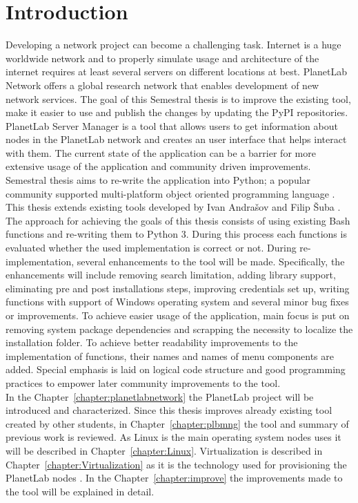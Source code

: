 \chapter*{Introduction}
{}

Developing a network project can become a challenging task. Internet is a huge worldwide network and to properly simulate usage and architecture of the internet requires at least several servers on different locations at best. PlanetLab Network offers a global research network that enables development of new network services. The goal of this Semestral thesis is to improve the existing tool, make it easier to use and publish the changes by updating the PyPI repositories. PlanetLab Server Manager is a tool that allows users to get information about nodes in the PlanetLab network and creates an user interface that helps interact with them. The current state of the application can be a barrier for more extensive usage of the application and community driven improvements. Semestral thesis aims to re-write the application into Python; a popular community supported multi-platform object oriented programming language \cite{lutz2013learning}. This thesis extends existing tools developed by Ivan Andrašov \cite{andrasov2} and Filip Šuba \cite{suba1}.\\
The approach for achieving the goals of this thesis consists of using existing Bash functions and re-writing them to Python 3. During this process each functions is evaluated whether the used implementation is correct or not. During re-implementation, several enhancements to the tool will be made. Specifically, the enhancements will include removing search limitation, adding library support, eliminating pre and post installations steps, improving credentials set up, writing functions with support of Windows operating system and several minor bug fixes or improvements. To achieve easier usage of the application, main focus is put on removing system package dependencies and scrapping the necessity to localize the installation folder. To achieve better readability improvements to the implementation of functions, their names and names of menu components are added. Special emphasis is laid on logical code structure and good programming practices to empower later community improvements to the tool.\\
In the Chapter~\ref{chapter:planetlabnetwork} the PlanetLab project will be introduced and characterized. Since this thesis improves already existing tool created by other students, in Chapter~\ref{chapter:plbmng} the tool and summary of previous work is reviewed. As Linux is the main operating system nodes uses it will be described in Chapter~\ref{chapter:Linux}. Virtualization is described in Chapter~\ref{chapter:Virtualization} as it is the technology used for provisioning the PlanetLab nodes \cite{planetlababout}. In the Chapter~\ref{chapter:improve} the improvements made to the tool will be explained in detail.